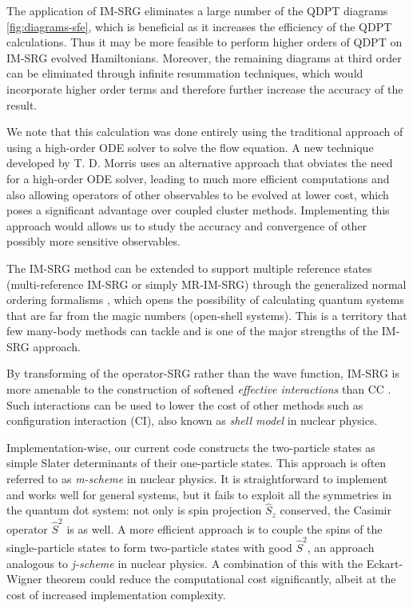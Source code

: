 The application of IM-SRG eliminates a large number of the QDPT diagrams \ref{fig:diagrams-sfe}, which is beneficial as it increases the efficiency of the QDPT calculations.  Thus it may be more feasible to perform higher orders of QDPT on IM-SRG evolved Hamiltonians.  Moreover, the remaining diagrams at third order can be eliminated through infinite resummation techniques, which would incorporate higher order terms and therefore further increase the accuracy of the result.

We note that this calculation was done entirely using the traditional approach of using a high-order ODE solver to solve the flow equation.  A new technique developed by T. D. Morris \cite{PhysRevC.92.034331} uses an alternative approach that obviates the need for a high-order ODE solver, leading to much more efficient computations and also allowing operators of other observables to be evolved at lower cost, which poses a significant advantage over coupled cluster methods.  Implementing this approach would allows us to study the accuracy and convergence of other possibly more sensitive observables.

The IM-SRG method can be extended to support multiple reference states (multi-reference IM-SRG or simply MR-IM-SRG) \cite{PhysRevLett.110.242501,PhysRevC.90.041302} through the generalized normal ordering formalisms \cite{doi:10.1063/1.474405}, which opens the possibility of calculating quantum systems that are far from the magic numbers (open-shell systems).  This is a territory that few many-body methods can tackle and is one of the major strengths of the IM-SRG approach.

By transforming of the operator-SRG rather than the wave function, IM-SRG is more amenable to the construction of softened \textit{effective interactions} than CC \cite{Hergert2016165}.  Such interactions can be used to lower the cost of other methods such as configuration interaction (CI), also known as \textit{shell model} in nuclear physics.

Implementation-wise, our current code constructs the two-particle states as simple Slater determinants of their one-particle states.  This approach is often referred to as \textit{m-scheme} in nuclear physics.  It is straightforward to implement and works well for general systems, but it fails to exploit all the symmetries in the quantum dot system: not only is spin projection $\hat S_z$ conserved, the Casimir operator $\hat S^2$ is as well.  A more efficient approach is to couple the spins of the single-particle states to form two-particle states with good $\hat S^2$, an approach analogous to \textit{j-scheme} in nuclear physics.  A combination of this with the Eckart-Wigner theorem could reduce the computational cost significantly, albeit at the cost of increased implementation complexity.

